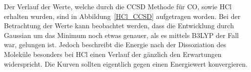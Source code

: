Der Verlauf der Werte, welche durch die CCSD Methode für CO, sowie HCl erhalten wurden, sind in Abbildung~\ref{HCl_CCSD} aufgetragen worden. Bei der Betrachtung der Werte kann beobachtet werden, dass die Entwicklung durch Gaussian um das Minimum noch etwas genauer, als es mittels B3LYP der Fall war, gelungen ist. Jedoch beschreibt die Energie  nach der Dissoziation des Moleküle besonders bei HCl einen Verlauf der gänzlich den Erwartungen widerspricht. Die Kurven sollten eigentlich gegen einen Energiewert konvergieren. 






 
 






%
